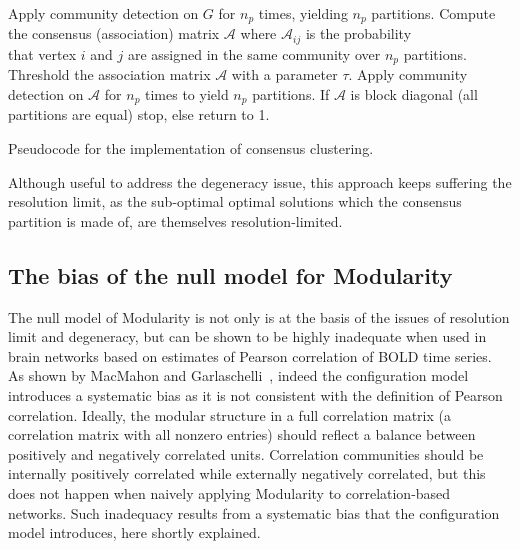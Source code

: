 \begin{Algorithm}[htb!]
\begin{codebox}
\li Apply community detection on $G$ for $n_p$ times, yielding $n_p$ partitions.
\li Compute the consensus (association) matrix $\mathcal{A}$ where $\mathcal{A}_{ij}$ is the probability \\that vertex $i$ and $j$ are assigned in the same community over $n_p$ partitions.
\li Threshold the association matrix $\mathcal{A}$ with a parameter $\tau$.
\li Apply community detection on $\mathcal{A}$ for $n_p$ times to yield $n_p$ partitions.
\li If $\mathcal{A}$ is block diagonal (all partitions are equal) stop, else return to 1.
\end{codebox}
\caption{Pseudocode for the implementation of consensus clustering.}
\label{alg:consensus_clustering}
\end{Algorithm}

Although useful to address the degeneracy issue, this approach keeps suffering the resolution limit, as the sub-optimal optimal solutions which the consensus partition is made of, are themselves resolution-limited.

\subsection{The bias of the null model for Modularity}
The null model of Modularity is not only is at the basis of the issues of resolution limit and degeneracy, but can be shown to be highly inadequate when used in brain networks based on estimates of Pearson correlation of BOLD time series.
As shown by MacMahon and Garlaschelli~\cite{macmahon2015}, indeed the configuration model introduces a systematic bias as it is not consistent with the definition of Pearson correlation.
Ideally, the modular structure in a full correlation matrix (a correlation matrix with all nonzero entries) should reflect a balance between positively and negatively correlated units. Correlation communities should be internally positively correlated while externally negatively correlated, but this does not happen when naively applying Modularity to correlation-based networks.
Such inadequacy results from a systematic bias that the configuration model introduces, here shortly explained.


